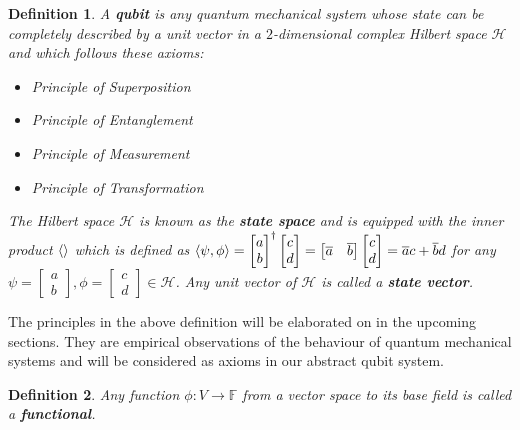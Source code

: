 \documentclass[12pt,twoside,fleqn]{report}
\theoremstyle{thmstyle}
\newtheorem{defn}{Definition}[chapter]
\begin{document}
\begin{samepage}
\begin{defn}
    A \textbf{qubit} is any quantum mechanical system whose state can be completely described by a unit vector in a $2$-dimensional complex Hilbert space $\mathcal{H}$ and which follows these axioms: 
\begin{itemize}
    \item Principle of Superposition
    \item Principle of Entanglement
    \item Principle of Measurement
    \item Principle of Transformation
\end{itemize}
    The Hilbert space $\mathcal{H}$ is known as the \textbf{state space} and is equipped with the inner product $\braket{}$ which is defined as $\braket{\psi, \phi} = \begin{bmatrix} a \\ b \end{bmatrix}^\dagger \begin{bmatrix} c \\ d \end{bmatrix} = \begin{bmatrix} \overline{a} & \overline{b} \end{bmatrix} \begin{bmatrix} c \\ d \end{bmatrix} = \overline{a} c + \overline{b} d$ for any $\psi = \begin{bmatrix} a\\b\end{bmatrix}, \phi = \begin{bmatrix} c \\ d \end{bmatrix} \in \mathcal{H}$. Any unit vector of $\mathcal{H}$ is called a \textbf{state vector}.
\end{defn}

The principles in the above definition will be elaborated on in the upcoming sections.
They are empirical observations of the behaviour of quantum mechanical systems and will be considered as axioms in our abstract qubit system.
\end{samepage}


\begin{defn}
    Any function $\phi: V \to \mathbb{F}$ from a vector space to its base field is called a \textbf{functional}. 
\end{defn}
\end{document}
